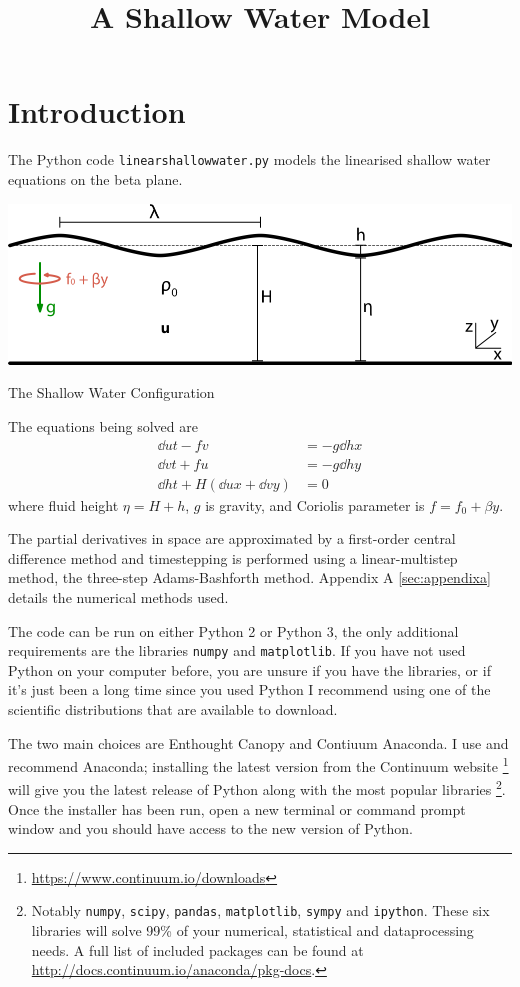 \documentclass[a4paper, sfsidenotes, twoside]{tufte-handout}
\title{A Shallow Water Model}
\begin{document}
  \section{Introduction}
  \label{sec:Introduction}
  The Python code \texttt{linearshallowwater.py} models the linearised shallow
  water equations on the beta plane.
  \begin{marginfigure}[1in]
    \includegraphics{shallow_water}
    \caption{The Shallow Water Configuration}
    \label{fig:shallow}
  \end{marginfigure}
  The equations being solved are
  \begin{subequations}
    \label{eqn:sw}
    \begin{align}
      \dd{u}{t} - fv &= - g \dd{h}{x} \\
      \dd{v}{t} + fu &= - g \dd{h}{y} \\
      \dd{h}{t} + H(\dd{u}{x} + \dd{v}{y}) &= 0
    \end{align}
  \end{subequations}
  where fluid height $\eta = H + h$, $g$ is gravity, and Coriolis parameter is $f=f_0 + \beta y$.

  The partial derivatives in space are approximated by a first-order central
  difference method and timestepping is performed using a linear-multistep method,
  the three-step Adams-Bashforth method.
  Appendix A \ref{sec:appendixa} details the numerical methods used.

  The code can be run on either Python 2 or Python 3, the only additional requirements are the libraries \texttt{numpy} and \texttt{matplotlib}.
  If you have not used Python on your computer before, you are unsure if you have the libraries, or if it's just been a long time since you used Python I recommend using one of the scientific distributions that are available to download.

  The two main choices are Enthought Canopy and Contiuum Anaconda.
  I use and recommend Anaconda; installing the latest version from the Continuum website \footnote{\url{https://www.continuum.io/downloads}} will give you the latest release of Python along with the most popular libraries \footnote{Notably \texttt{numpy}, \texttt{scipy}, \texttt{pandas}, \texttt{matplotlib}, \texttt{sympy} and \texttt{ipython}.  These six libraries will solve 99\% of your numerical, statistical and dataprocessing needs.
  A full list of included packages can be found at \url{http://docs.continuum.io/anaconda/pkg-docs}.}.
  Once the installer has been run, open a new terminal or command prompt window and you should have access to the new version of Python.
\end{document}
